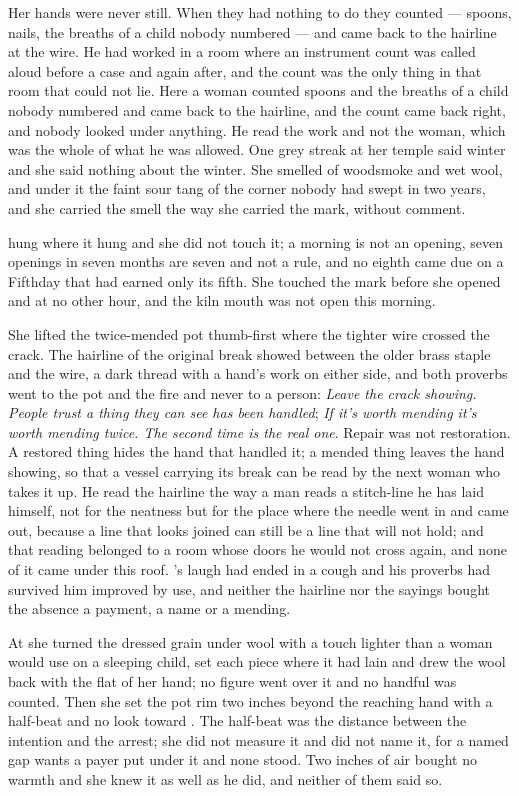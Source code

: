 Her hands were never still. When they had nothing to do they counted --- spoons, nails, the breaths of a child nobody numbered --- and came back to the hairline at the wire. He had worked in a room where an instrument count was called aloud before a case and again after, and the count was the only thing in that room that could not lie. Here a woman counted spoons and the breaths of a child nobody numbered and came back to the hairline, and the count came back right, and nobody looked under anything. He read the work and not the woman, which was the whole of what he was allowed. One grey streak at her temple said winter and she said nothing about the winter. She smelled of woodsmoke and wet wool, and under it the faint sour tang of the corner nobody had swept in two years, and she carried the smell the way she carried the mark, without comment.

 hung where it hung and she did not touch it; a morning is not an opening, seven openings in seven months are seven and not a rule, and no eighth came due on a Fifthday that had earned only its fifth. She touched the mark before she opened  and at no other hour, and the kiln mouth was not open this morning.

She lifted the twice-mended pot thumb-first where the tighter wire crossed the crack. The hairline of the original break showed between the older brass staple and the wire, a dark thread with a hand's work on either side, and both proverbs went to the pot and the fire and never to a person: \emph{Leave the crack showing. People trust a thing they can see has been handled}; \emph{If it's worth mending it's worth mending twice. The second time is the real one}. Repair was not restoration. A restored thing hides the hand that handled it; a mended thing leaves the hand showing, so that a vessel carrying its break can be read by the next woman who takes it up. He read the hairline the way a man reads a stitch-line he has laid himself, not for the neatness but for the place where the needle went in and came out, because a line that looks joined can still be a line that will not hold; and that reading belonged to a room whose doors he would not cross again, and none of it came under this roof. 's laugh had ended in a cough and his proverbs had survived him improved by use, and neither the hairline nor the sayings bought the absence a payment, a name or a mending.

At  she turned the dressed grain under wool with a touch lighter than a woman would use on a sleeping child, set each piece where it had lain and drew the wool back with the flat of her hand; no figure went over it and no handful was counted. Then she set the pot rim two inches beyond the reaching hand with a half-beat and no look toward . The half-beat was the distance between the intention and the arrest; she did not measure it and did not name it, for a named gap wants a payer put under it and none stood. Two inches of air bought no warmth and she knew it as well as he did, and neither of them said so.

